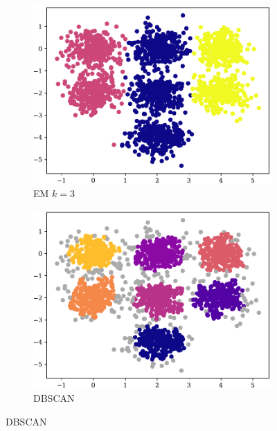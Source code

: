 \begin{figure}[t!]
    \begin{subfigure}[b]{0.45\textwidth}
        \includegraphics[width=\textwidth]{../plots/7-3_pred_em.pdf}
        \caption{EM $k = 3$}
        \label{subfig:7-3-em}
    \end{subfigure}
    \hspace{0.09\textwidth}
    \begin{subfigure}[b]{0.45\textwidth}
        \includegraphics[width=\textwidth]{../plots/7-3_pred_dbscan.pdf}
        \caption{DBSCAN}
        \label{subfig:7-3-dbscan}
    \end{subfigure}
\end{figure}
